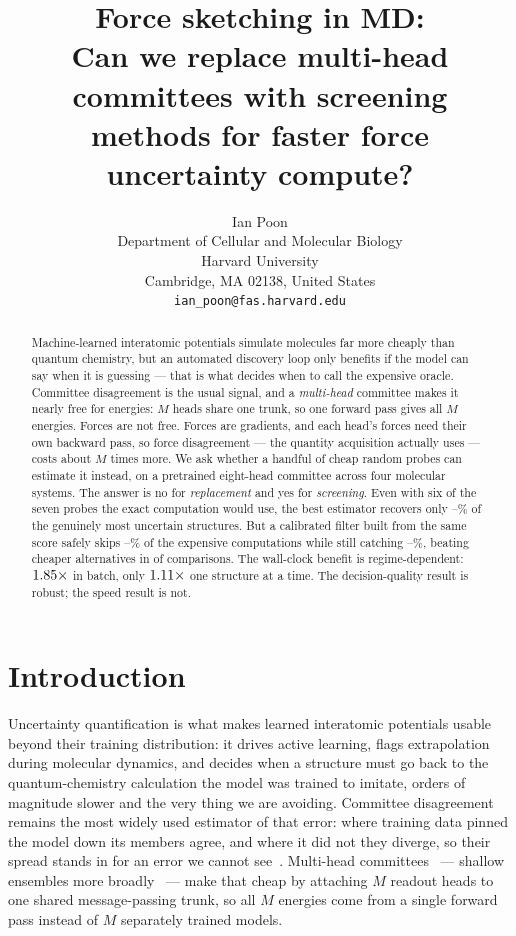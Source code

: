 \documentclass{article}
\title{Force sketching in MD:\\
Can we replace multi-head committees with screening\\
methods for faster force uncertainty compute?}
\author{%
  Ian Poon \\
  Department of Cellular and Molecular Biology \\
  Harvard University \\
  Cambridge, MA 02138, United States \\
  \texttt{ian\_poon@fas.harvard.edu} \\
}
\begin{document}
\maketitle

\begin{abstract}
Machine-learned interatomic potentials simulate molecules far more cheaply than quantum chemistry,
but an automated discovery loop only benefits if the model can say when it is guessing --- that is
what decides when to call the expensive oracle. Committee disagreement is the usual signal, and a
\emph{multi-head} committee makes it nearly free for energies: $M$ heads share one trunk, so one
forward pass gives all $M$ energies. Forces are not free. Forces are gradients, and each head's
forces need their own backward pass, so force disagreement --- the quantity acquisition actually
uses --- costs about $M$ times more. We ask whether a handful of cheap random probes can estimate it
instead, on a pretrained eight-head committee across four molecular systems. The answer is no for
\emph{replacement} and yes for \emph{screening}. Even with six of the seven probes the exact
computation would use, the best estimator recovers only
\fsMaxRecallKSixLoPct--\fsMaxRecallKSixHiPct\% of the genuinely most uncertain structures. But a
calibrated filter built from the same score safely skips
\fsGateCVSkipLoPct--\fsGateCVSkipHiPct\% of the expensive computations while still catching
\fsGateCVRecallLoPct--\fsGateCVRecallHiPct\%, beating cheaper alternatives in \fsGateCVDominates{} of
\fsGateCVComparisons{} comparisons. The wall-clock benefit is regime-dependent:
$1.85\times$ in batch, only $1.11\times$ one structure at a
time. The decision-quality result is robust; the speed result is not.
\end{abstract}

\section{Introduction}
Uncertainty quantification is what makes learned interatomic potentials usable beyond their training
distribution: it drives active learning, flags extrapolation during molecular dynamics, and decides
when a structure must go back to the quantum-chemistry calculation the model was trained to imitate,
orders of magnitude slower and the very thing we are avoiding. Committee disagreement remains the
most widely used estimator of that error: where training data pinned the model down its members
agree, and where it did not they diverge, so their spread stands in for an error we cannot
see~\citep{behler2015,podryabinkin2017,carrete2023}. Multi-head
committees~\citep{beck2025mhc} --- shallow ensembles more broadly~\citep{kellner2024} --- make that
cheap by attaching $M$ readout heads to one shared message-passing trunk, so all $M$ energies come
from a single forward pass instead of $M$ separately trained models.
\end{document}
